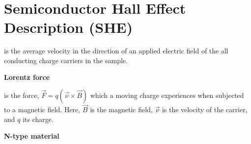 \documentclass{../lab}
\begin{document}
\maketitle

\tableofcontents

\section{Semiconductor Hall Effect Description (SHE)}

is the average velocity in the direction of an applied electric field of the all conducting charge carriers in the sample.

\textbf{Lorentz force}

is the force, $ \vec{F}=q(\vec{\nu}\times\vec{B}) $ which a moving charge experiences when subjected to a magnetic field. Here, $ \vec{B} $ is the magnetic field, $ \vec{\nu} $ is the velocity of the carrier, and $q$ its charge.

\textbf{N-type material}
\end{document}
